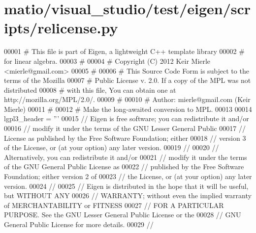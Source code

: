 \hypertarget{matio_2visual__studio_2test_2eigen_2scripts_2relicense_8py_source}{}\section{matio/visual\+\_\+studio/test/eigen/scripts/relicense.py}
\label{matio_2visual__studio_2test_2eigen_2scripts_2relicense_8py_source}

\begin{DoxyCode}
00001 \textcolor{comment}{# This file is part of Eigen, a lightweight C++ template library}
00002 \textcolor{comment}{# for linear algebra.}
00003 \textcolor{comment}{#}
00004 \textcolor{comment}{# Copyright (C) 2012 Keir Mierle <mierle@gmail.com>}
00005 \textcolor{comment}{#}
00006 \textcolor{comment}{# This Source Code Form is subject to the terms of the Mozilla}
00007 \textcolor{comment}{# Public License v. 2.0. If a copy of the MPL was not distributed}
00008 \textcolor{comment}{# with this file, You can obtain one at http://mozilla.org/MPL/2.0/.}
00009 \textcolor{comment}{#}
00010 \textcolor{comment}{# Author: mierle@gmail.com (Keir Mierle)}
00011 \textcolor{comment}{#}
00012 \textcolor{comment}{# Make the long-awaited conversion to MPL.}
00013 
00014 lgpl3\_header = \textcolor{stringliteral}{'''}
00015 \textcolor{stringliteral}{// Eigen is free software; you can redistribute it and/or}
00016 \textcolor{stringliteral}{// modify it under the terms of the GNU Lesser General Public}
00017 \textcolor{stringliteral}{// License as published by the Free Software Foundation; either}
00018 \textcolor{stringliteral}{// version 3 of the License, or (at your option) any later version.}
00019 \textcolor{stringliteral}{//}
00020 \textcolor{stringliteral}{// Alternatively, you can redistribute it and/or}
00021 \textcolor{stringliteral}{// modify it under the terms of the GNU General Public License as}
00022 \textcolor{stringliteral}{// published by the Free Software Foundation; either version 2 of}
00023 \textcolor{stringliteral}{// the License, or (at your option) any later version.}
00024 \textcolor{stringliteral}{//}
00025 \textcolor{stringliteral}{// Eigen is distributed in the hope that it will be useful, but WITHOUT ANY}
00026 \textcolor{stringliteral}{// WARRANTY; without even the implied warranty of MERCHANTABILITY or FITNESS}
00027 \textcolor{stringliteral}{// FOR A PARTICULAR PURPOSE. See the GNU Lesser General Public License or the}
00028 \textcolor{stringliteral}{// GNU General Public License for more details.}
00029 \textcolor{stringliteral}{//}

\end{DoxyCode}

